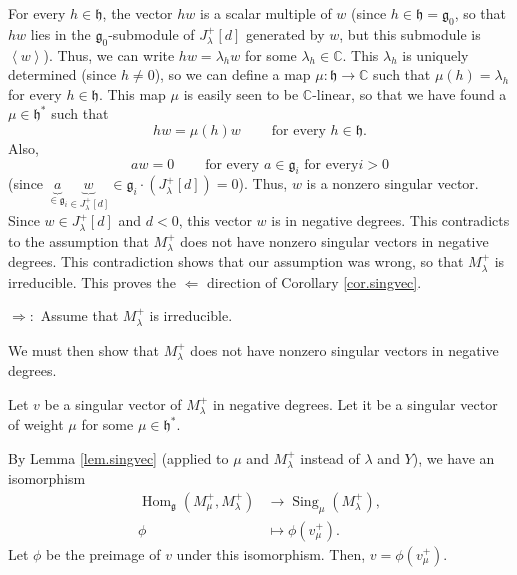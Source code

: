 \documentclass
[numbers=enddot,12pt,final,onecolumn,german,notitlepage]{scrartcl}%
\theoremstyle{definition}
\begin{document}
For every $h\in\mathfrak{h}$, the vector $hw$ is a scalar multiple of $w$
(since $h\in\mathfrak{h}=\mathfrak{g}_{0}$, so that $hw$ lies in the
$\mathfrak{g}_{0}$-submodule of $J_{\lambda}^{+}\left[  d\right]  $ generated
by $w$, but this submodule is $\left\langle w\right\rangle $). Thus, we can
write $hw=\lambda_{h}w$ for some $\lambda_{h}\in\mathbb{C}$. This $\lambda
_{h}$ is uniquely determined (since $h\neq0$), so we can define a map
$\mu:\mathfrak{h}\rightarrow\mathbb{C}$ such that $\mu\left(  h\right)
=\lambda_{h}$ for every $h\in\mathfrak{h}$. This map $\mu$ is easily seen to
be $\mathbb{C}$-linear, so that we have found a $\mu\in\mathfrak{h}^{\ast}$
such that%
\[
hw=\mu\left(  h\right)  w\ \ \ \ \ \ \ \ \ \ \text{for every }h\in
\mathfrak{h}.
\]
Also,%
\[
aw=0\ \ \ \ \ \ \ \ \ \ \text{for every }a\in\mathfrak{g}_{i}\text{ for every
}i>0
\]
(since $\underbrace{a}_{\in\mathfrak{g}_{i}}\underbrace{w}_{\in J_{\lambda
}^{+}\left[  d\right]  }\in\mathfrak{g}_{i}\cdot\left(  J_{\lambda}^{+}\left[
d\right]  \right)  =0$). Thus, $w$ is a nonzero singular vector. Since $w\in
J_{\lambda}^{+}\left[  d\right]  $ and $d<0$, this vector $w$ is in negative
degrees. This contradicts to the assumption that $M_{\lambda}^{+}$ does not
have nonzero singular vectors in negative degrees. This contradiction shows
that our assumption was wrong, so that $M_{\lambda}^{+}$ is irreducible. This
proves the $\Longleftarrow$ direction of Corollary \ref{cor.singvec}.

$\Longrightarrow:$ Assume that $M_{\lambda}^{+}$ is irreducible.

We must then show that $M_{\lambda}^{+}$ does not have nonzero singular
vectors in negative degrees.

Let $v$ be a singular vector of $M_{\lambda}^{+}$ in negative degrees. Let it
be a singular vector of weight $\mu$ for some $\mu\in\mathfrak{h}^{\ast}$.

By Lemma \ref{lem.singvec} (applied to $\mu$ and $M_{\lambda}^{+}$ instead of
$\lambda$ and $Y$), we have an isomorphism%
\begin{align*}
\operatorname*{Hom}\nolimits_{\mathfrak{g}}\left(  M_{\mu}^{+},M_{\lambda}%
^{+}\right)   &  \rightarrow\operatorname*{Sing}\nolimits_{\mu}\left(
M_{\lambda}^{+}\right)  ,\\
\phi &  \mapsto\phi\left(  v_{\mu}^{+}\right)  .
\end{align*}
Let $\phi$ be the preimage of $v$ under this isomorphism. Then, $v=\phi\left(
v_{\mu}^{+}\right)  $.
\end{document}
